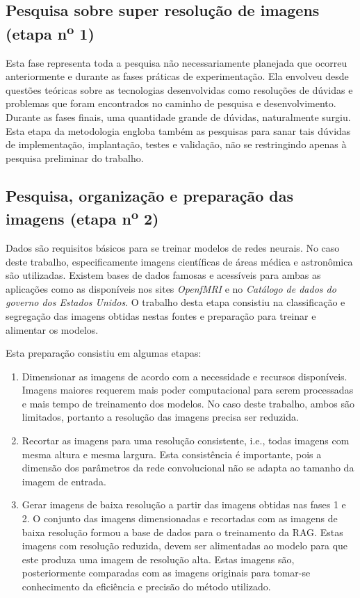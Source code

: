 \subsection{Pesquisa sobre super resolução de imagens (etapa n\textsuperscript{o} 1)}
\label{sec:procedimentos:pesquisa-super-resolucao}

Esta fase representa toda a pesquisa não necessariamente planejada que ocorreu anteriormente e durante as fases práticas de experimentação. Ela envolveu desde questões teóricas sobre as tecnologias desenvolvidas como resoluções de dúvidas e problemas que foram encontrados no caminho de pesquisa e desenvolvimento. Durante as fases finais, uma quantidade grande de dúvidas, naturalmente surgiu. Esta etapa da metodologia engloba também as pesquisas para sanar tais dúvidas de implementação, implantação, testes e validação, não se restringindo apenas à pesquisa preliminar do trabalho.

\subsection{Pesquisa, organização e preparação das imagens (etapa n\textsuperscript{o} 2)}
\label{sec:procedimentos:organizacao-preparacao-imagens}

Dados são requisitos básicos para se treinar modelos de redes neurais. No caso deste trabalho, especificamente  imagens científicas de áreas médica e astronômica são utilizadas. Existem bases de dados famosas e acessíveis para ambas as aplicações como as disponíveis nos sites \textit{OpenfMRI} e no \textit{Catálogo de dados do governo dos Estados Unidos}. O trabalho desta etapa consistiu na classificação e segregação das imagens obtidas nestas fontes e preparação para treinar e alimentar os modelos. 

Esta preparação consistiu em algumas etapas:

\begin{enumerate}
    \item Dimensionar as imagens de acordo com a necessidade e recursos disponíveis. Imagens maiores requerem mais poder computacional para serem processadas e mais tempo de treinamento dos modelos. No caso deste trabalho, ambos são limitados, portanto a resolução das imagens precisa ser reduzida.
    
    \item Recortar as imagens para uma resolução consistente, i.e., todas imagens com mesma altura e mesma largura. Esta consistência é importante, pois a dimensão dos parâmetros da rede convolucional não se adapta ao tamanho da imagem de entrada.
    
    \item Gerar imagens de baixa resolução a partir das imagens obtidas nas fases 1 e 2. O conjunto das imagens dimensionadas e recortadas com as imagens de baixa resolução formou a base de dados para o treinamento da RAG. Estas imagens com resolução reduzida, devem ser alimentadas ao modelo para que este produza uma imagem de resolução alta. Estas imagens são, posteriormente comparadas com as imagens originais para tomar-se conhecimento da eficiência e precisão do método utilizado.
    
\end{enumerate}


